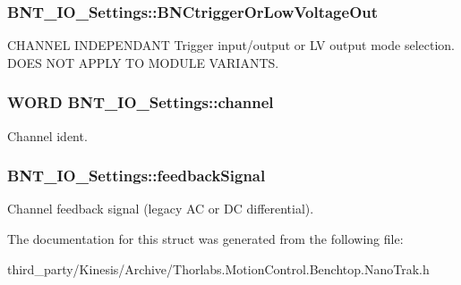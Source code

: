 \subsubsection[{\texorpdfstring{B\+N\+Ctrigger\+Or\+Low\+Voltage\+Out}{BNCtriggerOrLowVoltageOut}}]{ B\+N\+T\+\_\+\+I\+O\+\_\+\+Settings\+::\+B\+N\+Ctrigger\+Or\+Low\+Voltage\+Out}\hypertarget{struct_b_n_t___i_o___settings_a3eae90a1bd8ef2a50889486693e08ce4}{}\label{struct_b_n_t___i_o___settings_a3eae90a1bd8ef2a50889486693e08ce4}


C\+H\+A\+N\+N\+EL I\+N\+D\+E\+P\+E\+N\+D\+A\+NT Trigger input/output or LV output mode selection. D\+O\+ES N\+OT A\+P\+P\+LY TO M\+O\+D\+U\+LE V\+A\+R\+I\+A\+N\+TS. 

\subsubsection[{\texorpdfstring{channel}{channel}}]{\setlength{\rightskip}{0pt plus 5cm}W\+O\+RD B\+N\+T\+\_\+\+I\+O\+\_\+\+Settings\+::channel}\hypertarget{struct_b_n_t___i_o___settings_a0c5147c03530fbd73f754474cd8dedd9}{}\label{struct_b_n_t___i_o___settings_a0c5147c03530fbd73f754474cd8dedd9}


Channel ident. 

\subsubsection[{\texorpdfstring{feedback\+Signal}{feedbackSignal}}]{ B\+N\+T\+\_\+\+I\+O\+\_\+\+Settings\+::feedback\+Signal}\hypertarget{struct_b_n_t___i_o___settings_a0d357ff43ca3327996b6029d27f8e69c}{}\label{struct_b_n_t___i_o___settings_a0d357ff43ca3327996b6029d27f8e69c}


Channel feedback signal (legacy AC or DC differential). 



The documentation for this struct was generated from the following file\+:\begin{DoxyCompactItemize}
\item 
third\+\_\+party/\+Kinesis/\+Archive/Thorlabs.\+Motion\+Control.\+Benchtop.\+Nano\+Trak.\+h\end{DoxyCompactItemize}
